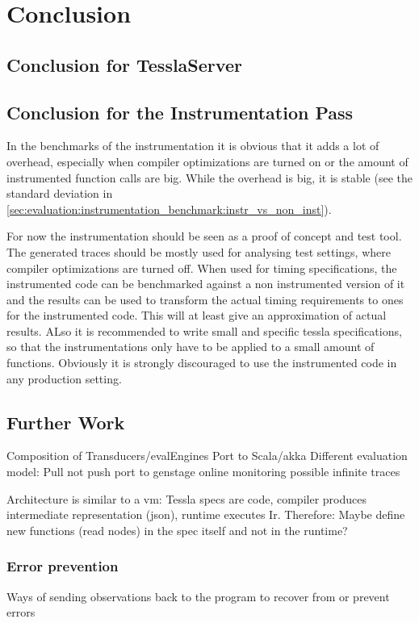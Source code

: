 %
\chapter{Conclusion}
\label{sec:conclusion}

\section{Conclusion for TesslaServer}

\section{Conclusion for the Instrumentation Pass}

In the benchmarks of the instrumentation it is obvious that it adds a lot of overhead, especially when compiler optimizations are turned on or the amount of instrumented function calls are big.
While the overhead is big, it is stable (see the standard deviation in \cref{sec:evaluation:instrumentation_benchmark:instr_vs_non_inst}).

For now the instrumentation should be seen as a proof of concept and test tool.
The generated traces should be mostly used for analysing test settings, where compiler optimizations are turned off.
When used for timing specifications, the instrumented code can be benchmarked against a non instrumented version of it and the results can be used to transform the actual timing requirements to ones for the instrumented code.
This will at least give an approximation of actual results.
ALso it is recommended to write small and specific \gls{tessla} specifications, so that the instrumentations only have to be applied to a small amount of functions.
Obviously it is strongly discouraged to use the instrumented code in any production setting.

\section{Further Work}
\label{sec:conclusion:further_work}

Composition of Transducers/evalEngines
Port to Scala/akka
Different evaluation model: Pull not push
port to genstage
online monitoring
possible infinite traces

Architecture is similar to a vm: Tessla specs are code, compiler produces intermediate representation (json), runtime executes Ir.
Therefore: Maybe define new functions (read nodes) in the spec itself and not in the runtime?

\subsection{Error prevention}
\label{sec:conclusion:further_work:error_prevention}
Ways of sending observations back to the program to recover from or prevent errors

